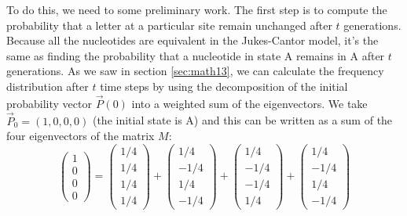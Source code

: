 \documentclass[
]{book}
\theoremstyle{definition}
\theoremstyle{definition}
\theoremstyle{definition}
\theoremstyle{remark}
\begin{document}
To do this, we need to some preliminary work. The first step is to compute the probability that a letter at a particular site remain unchanged after \(t\) generations. Because all the nucleotides are equivalent in the Jukes-Cantor model, it's the same as finding the probability that a nucleotide in state A remains in A after \(t\) generations. As we saw in section \ref{sec:math13}, we can calculate the frequency distribution after \(t\) time steps by using the decomposition of the initial probability vector \(\vec P(0)\) into a weighted sum of the eigenvectors. We take \(\vec P_0 = (1,0,0,0)\) (the initial state is A) and this can be written as a sum of the four eigenvectors of the matrix \(M\):
\[ \left(\begin{array}{c} 1 \\ 0 \\ 0 \\ 0 \end{array}\right) = \left(\begin{array}{c} 1/4 \\ 1/4 \\ 1/4 \\ 1/4 \end{array}\right) + \left(\begin{array}{c} 1/4 \\ -1/4 \\ 1/4 \\ -1/4 \end{array}\right) +  \left(\begin{array}{c} 1/4 \\ -1/4 \\ -1/4 \\ 1/4 \end{array}\right) + \left(\begin{array}{c} 1/4 \\ -1/4 \\ 1/4 \\ -1/4 \end{array}\right) \]
\end{document}
